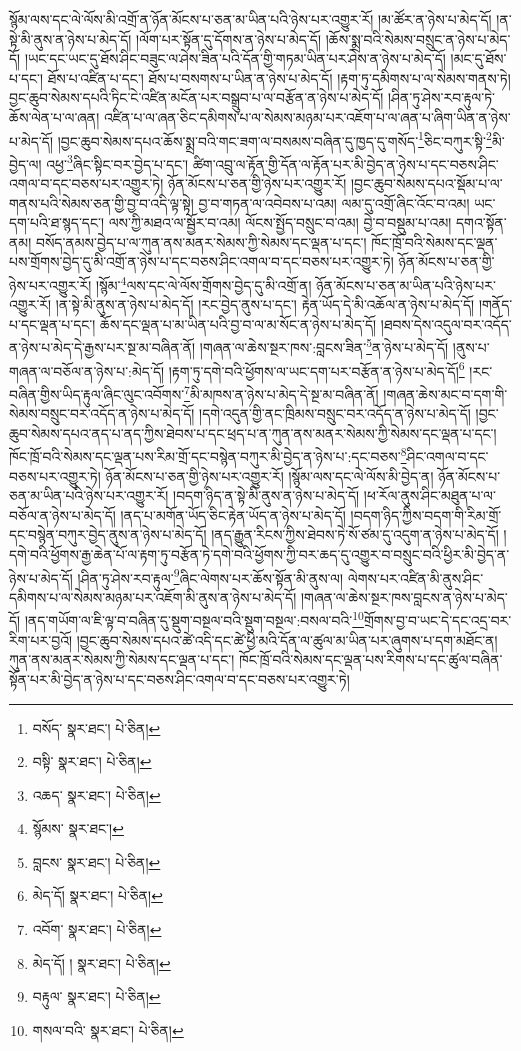 སྙོམ་ལས་དང་ལེ་ལོས་མི་འགྲོ་ན་ཉོན་མོངས་པ་ཅན་མ་ཡིན་པའི་ཉེས་པར་འགྱུར་རོ། །མ་ཚོར་ན་ཉེས་པ་མེད་དོ། །ན་སྟེ་མི་ནུས་ན་ཉེས་པ་མེད་དོ། །ལོག་པར་སྟོན་དུ་དོགས་ན་ཉེས་པ་མེད་དོ། །ཆོས་སྨྲ་བའི་སེམས་བསྲུང་ན་ཉེས་པ་མེད་དོ། །ཡང་དང་ཡང་དུ་ཐོས་ཤིང་བཟུང་ལ་ཤེས་ཟིན་པའི་དོན་གྱི་གཏམ་ཡིན་པར་ཤེས་ན་ཉེས་པ་མེད་དོ། །མང་དུ་ཐོས་པ་དང་། ཐོས་པ་འཛིན་པ་དང་། ཐོས་པ་བསགས་པ་ཡིན་ན་ཉེས་པ་མེད་དོ། །རྟག་ཏུ་དམིགས་པ་ལ་སེམས་གནས་ཏེ། བྱང་ཆུབ་སེམས་དཔའི་ཏིང་ངེ་འཛིན་མངོན་པར་བསྒྲུབ་པ་ལ་བརྩོན་ན་ཉེས་པ་མེད་དོ། །ཤིན་ཏུ་ཤེས་རབ་རྟུལ་ཏེ་ཆོས་ལེན་པ་ལ་ཞན། འཛིན་པ་ལ་ཞན་ཅིང་དམིགས་པ་ལ་སེམས་མཉམ་པར་འཇོག་པ་ལ་ཞན་པ་ཞིག་ཡིན་ན་ཉེས་པ་མེད་དོ། །བྱང་ཆུབ་སེམས་དཔའ་ཆོས་སྨྲ་བའི་གང་ཟག་ལ་བསམས་བཞིན་དུ་ཁྱད་དུ་གསོད་\footnote{བསོད་  སྣར་ཐང་།  པེ་ཅིན། }ཅིང་བཀུར་སྟི་\footnote{བསྟི་  སྣར་ཐང་།  པེ་ཅིན། }མི་བྱེད་ལ། འཕྱ་\footnote{འཆད་  སྣར་ཐང་།  པེ་ཅིན། }ཞིང་སྟིང་བར་བྱེད་པ་དང་། ཚིག་འབྲུ་ལ་རྟོན་གྱི་དོན་ལ་རྟོན་པར་མི་བྱེད་ན་ཉེས་པ་དང་བཅས་ཤིང་འགལ་བ་དང་བཅས་པར་འགྱུར་ཏེ། ཉོན་མོངས་པ་ཅན་གྱི་ཉེས་པར་འགྱུར་རོ། །བྱང་ཆུབ་སེམས་དཔའ་སྡོམ་པ་ལ་གནས་པའི་སེམས་ཅན་གྱི་བྱ་བ་འདི་ལྟ་སྟེ། བྱ་བ་གཏན་ལ་འབེབས་པ་འམ། ལམ་དུ་འགྲོ་ཞིང་འོང་བ་འམ། ཡང་དག་པའི་ཐ་སྙད་དང་། ལས་ཀྱི་མཐའ་ལ་སྦྱོར་བ་འམ། ལོངས་སྤྱོད་བསྲུང་བ་འམ། བྱེ་བ་བསྡུམ་པ་འམ། དགའ་སྟོན་ནམ། བསོད་ནམས་བྱེད་པ་ལ་ཀུན་ནས་མནར་སེམས་ཀྱི་སེམས་དང་ལྡན་པ་དང་། ཁོང་ཁྲོ་བའི་སེམས་དང་ལྡན་པས་གྲོགས་བྱེད་དུ་མི་འགྲོ་ན་ཉེས་པ་དང་བཅས་ཤིང་འགལ་བ་དང་བཅས་པར་འགྱུར་ཏེ། ཉོན་མོངས་པ་ཅན་གྱི་ཉེས་པར་འགྱུར་རོ། །སྙོམ་\footnote{སྙོམས་  སྣར་ཐང་། }ལས་དང་ལེ་ལོས་གྲོགས་བྱེད་དུ་མི་འགྲོ་ན། ཉོན་མོངས་པ་ཅན་མ་ཡིན་པའི་ཉེས་པར་འགྱུར་རོ། །ན་སྟེ་མི་ནུས་ན་ཉེས་པ་མེད་དོ། །རང་བྱེད་ནུས་པ་དང་། རྟེན་ཡོད་དེ་མི་འཆོལ་ན་ཉེས་པ་མེད་དོ། །གནོད་པ་དང་ལྡན་པ་དང་། ཆོས་དང་ལྡན་པ་མ་ཡིན་པའི་བྱ་བ་ལ་མ་སོང་ན་ཉེས་པ་མེད་དོ། །ཐབས་དེས་འདུལ་བར་འདོད་ན་ཉེས་པ་མེད་དེ་རྒྱས་པར་སྔ་མ་བཞིན་ནོ། །གཞན་ལ་ཆེས་སྔར་ཁས་:བླངས་ཟིན་\footnote{བླངས་  སྣར་ཐང་།  པེ་ཅིན། }ན་ཉེས་པ་མེད་དོ། །ནུས་པ་གཞན་ལ་བཅོལ་ན་ཉེས་པ་:མེད་དོ། །རྟག་ཏུ་དགེ་བའི་ཕྱོགས་ལ་ཡང་དག་པར་བརྩོན་ན་ཉེས་པ་མེད་དོ།\footnote{མེད་དོ།  སྣར་ཐང་།  པེ་ཅིན། } །རང་བཞིན་གྱིས་ཡིད་རྟུལ་ཞིང་ལུང་འབོགས་\footnote{འབོག་  སྣར་ཐང་།  པེ་ཅིན། }མི་མཁས་ན་ཉེས་པ་མེད་དེ་སྔ་མ་བཞིན་ནོ། །གཞན་ཆེས་མང་བ་དག་གི་སེམས་བསྲུང་བར་འདོད་ན་ཉེས་པ་མེད་དོ། །དགེ་འདུན་གྱི་ནང་ཁྲིམས་བསྲུང་བར་འདོད་ན་ཉེས་པ་མེད་དོ། །བྱང་ཆུབ་སེམས་དཔའ་ནད་པ་ནད་ཀྱིས་ཐེབས་པ་དང་ཕྲད་པ་ན་ཀུན་ནས་མནར་སེམས་ཀྱི་སེམས་དང་ལྡན་པ་དང་། ཁོང་ཁྲོ་བའི་སེམས་དང་ལྡན་པས་རིམ་གྲོ་དང་བསྙེན་བཀུར་མི་བྱེད་ན་ཉེས་པ་:དང་བཅས་\footnote{མེད་དོ། །  སྣར་ཐང་།  པེ་ཅིན། }ཤིང་འགལ་བ་དང་བཅས་པར་འགྱུར་ཏེ། ཉོན་མོངས་པ་ཅན་གྱི་ཉེས་པར་འགྱུར་རོ། །སྙོམ་ལས་དང་ལེ་ལོས་མི་བྱེད་ན། ཉོན་མོངས་པ་ཅན་མ་ཡིན་པའི་ཉེས་པར་འགྱུར་རོ། །བདག་ཉིད་ན་སྟེ་མི་ནུས་ན་ཉེས་པ་མེད་དོ། །ཕ་རོལ་ནུས་ཤིང་མཐུན་པ་ལ་བཅོལ་ན་ཉེས་པ་མེད་དོ། །ནད་པ་མགོན་ཡོད་ཅིང་རྟེན་ཡོད་ན་ཉེས་པ་མེད་དོ། །བདག་ཉིད་ཀྱིས་བདག་གི་རིམ་གྲོ་དང་བསྙེན་བཀུར་བྱེད་ནུས་ན་ཉེས་པ་མེད་དོ། །ནད་རྒྱུན་རིངས་ཀྱིས་ཐེབས་ཏེ་སོ་ཙམ་དུ་འདུག་ན་ཉེས་པ་མེད་དོ། །དགེ་བའི་ཕྱོགས་རྒྱ་ཆེན་པོ་ལ་རྟག་ཏུ་བརྩོན་ཏེ་དགེ་བའི་ཕྱོགས་ཀྱི་བར་ཆད་དུ་འགྱུར་བ་བསྲུང་བའི་ཕྱིར་མི་བྱེད་ན་ཉེས་པ་མེད་དོ། །ཤིན་ཏུ་ཤེས་རབ་རྟུལ་\footnote{བརྟུལ་  སྣར་ཐང་།  པེ་ཅིན། }ཞིང་ལེགས་པར་ཆོས་སྟོན་མི་ནུས་ལ། ལེགས་པར་འཛིན་མི་ནུས་ཤིང་དམིགས་པ་ལ་སེམས་མཉམ་པར་འཇོག་མི་ནུས་ན་ཉེས་པ་མེད་དོ། །གཞན་ལ་ཆེས་སྔར་ཁས་བླངས་ན་ཉེས་པ་མེད་དོ། །ནད་གཡོག་ལ་ཇི་ལྟ་བ་བཞིན་དུ་སྡུག་བསྔལ་བའི་སྡུག་བསྔལ་:བསལ་བའི་\footnote{གསལ་བའི་  སྣར་ཐང་།  པེ་ཅིན། }གྲོགས་བྱ་བ་ཡང་དེ་དང་འདྲ་བར་རིག་པར་བྱའོ། །བྱང་ཆུབ་སེམས་དཔའ་ཚེ་འདི་དང་ཚེ་ཕྱི་མའི་དོན་ལ་ཚུལ་མ་ཡིན་པར་ཞུགས་པ་དག་མཐོང་ན། ཀུན་ནས་མནར་སེམས་ཀྱི་སེམས་དང་ལྡན་པ་དང་། ཁོང་ཁྲོ་བའི་སེམས་དང་ལྡན་པས་རིགས་པ་དང་ཚུལ་བཞིན་སྟོན་པར་མི་བྱེད་ན་ཉེས་པ་དང་བཅས་ཤིང་འགལ་བ་དང་བཅས་པར་འགྱུར་ཏེ། 